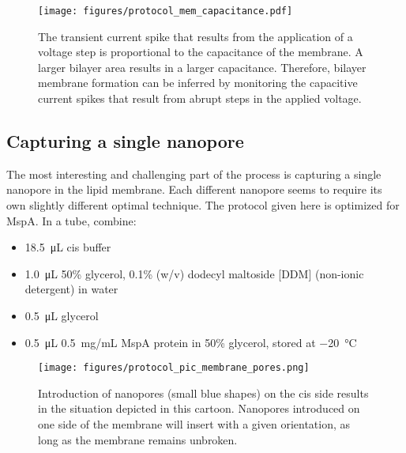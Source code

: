 \begin{figure}[h]
\begin{centering}
\texttt{[image: figures/protocol\_mem\_capacitance.pdf]}
\caption[Monitoring membrane capacitance]{The transient current spike that results from the application of a voltage step is proportional to the capacitance of the membrane.  A larger bilayer area results in a larger capacitance.  Therefore, bilayer membrane formation can be inferred by monitoring the capacitive current spikes that result from abrupt steps in the applied voltage.}
\label{fig:protocol_capacitance}
\end{centering}
\end{figure}

\subsection{Capturing a single nanopore}

The most interesting and challenging part of the process is capturing a single nanopore in the lipid membrane.  Each different nanopore seems to require its own slightly different optimal technique.  The protocol given here is optimized for MspA.  In a tube, combine:

\begin{itemize}
\item \SI{18.5}{\micro\liter} cis buffer
\item \SI{1.0}{\micro\liter} \num{50}\% glycerol, \num{0.1}\% (w/v) dodecyl maltoside [DDM] (non-ionic detergent) in water
\item \SI{0.5}{\micro\liter} glycerol
\item \SI{0.5}{\micro\liter} \SI{0.5}{\mg / \mL} MspA protein in \num{50}\% glycerol, stored at \SI{-20}{\celsius}
\end{itemize}

\begin{figure}[h]
\begin{centering}
\texttt{[image: figures/protocol\_pic\_membrane\_pores.png]}
\caption[Diagram of nanopore introduction]{Introduction of nanopores (small blue shapes) on the cis side results in the situation depicted in this cartoon.  Nanopores introduced on one side of the membrane will insert with a given orientation, as long as the membrane remains unbroken.}
\label{fig:protocol_pores}
\end{centering}
\end{figure}

